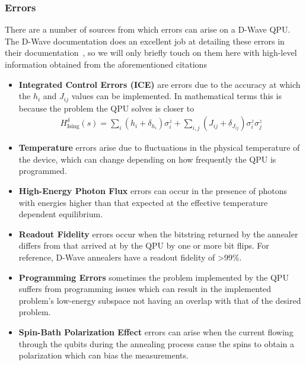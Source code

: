 \subsubsection{Errors}
There are a number of sources from which errors can arise on a D-Wave QPU.
The D-Wave documentation does an excellent job at detailing these errors in their documentation~\cite{dwave_ice_errors,dwave_other_errors}, so we will only briefly touch on them here with high-level information obtained from the aforementioned citations
\begin{itemize}
    \item \textbf{Integrated Control Errors (ICE)} are errors due to the accuracy at which the \( h_i \) and \( J_{ij} \) values can be implemented.
        In mathematical terms this is because the problem the QPU solves is closer to
        \begin{align}
            H_{\text{Ising}}^\delta(s) = \sum_i (h_i + \delta_{h_i}) \sigma_i^z + \sum_{i,j} (J_{ij} + \delta_{J_{ij}}) \sigma_i^z \sigma_j^z
        \end{align}
    \item \textbf{Temperature} errors arise due to fluctuations in the physical temperature of the device, which can change depending on how frequently the QPU is programmed.
    \item \textbf{High-Energy Photon Flux} errors can occur in the presence of photons with energies higher than that expected at the effective temperature dependent equilibrium.
    \item \textbf{Readout Fidelity} errors occur when the bitstring returned by the annealer differs from that arrived at by the QPU by one or more bit flips.
        For reference, D-Wave annealers have a readout fidelity of >99\%.
    \item \textbf{Programming Errors} sometimes the problem implemented by the QPU suffers from programming issues which can result in the implemented problem's low-energy subspace not having an overlap with that of the desired problem.
    \item \textbf{Spin-Bath Polarization Effect} errors can arise when the current flowing through the qubits during the annealing process cause the spins to obtain a polarization which can bias the measurements.
\end{itemize}
